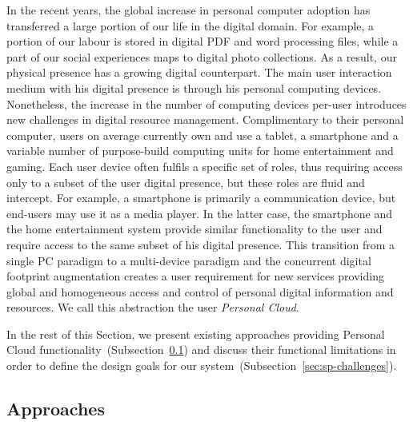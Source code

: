 In the recent years, the global increase in personal computer adoption has
transferred a large portion of our life in the digital domain. For example, a
portion of our labour is stored in digital PDF and word processing
files, while a part of our social experiences maps to digital photo collections.
As a result, our physical presence has a growing digital counterpart. The main
user interaction medium with his digital presence is through his personal
computing devices. Nonetheless, the increase in the number of computing devices
per-user introduces new challenges in digital resource management.
Complimentary to their personal computer, users on average currently own and use
a tablet, a smartphone and a variable number of purpose-build computing units
for home entertainment and gaming.  Each user device often fulfils a specific
set of roles, thus requiring access only to a subset of the user digital
presence, but these roles are fluid and intercept.  For example, a smartphone is
primarily a communication device, but end-users may use it as a media player. In
the latter case, the smartphone and the home entertainment system provide
similar functionality to the user and require access to the same subset of his
digital presence. This transition from a single PC paradigm to a multi-device
paradigm and the
concurrent digital footprint augmentation creates a user requirement for new
services providing global and homogeneous access and control of personal digital
information and resources. We call this abstraction the user \emph{Personal
  Cloud}. 

In the rest of this Section, we present existing approaches
providing Personal Cloud functionality~(Subsection~\ref{sec:sp-approaches}) and
discuss their functional limitations in order to define the design goals for our
\signpost system~(Subsection~\ref{sec:sp-challenges}). 

\subsection{Approaches} \label{sec:sp-approaches}


